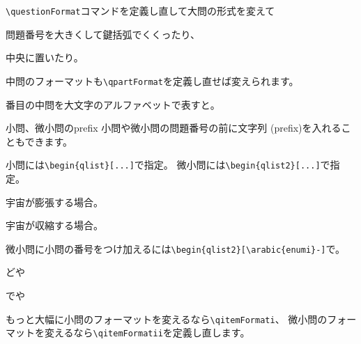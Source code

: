 \documentclass[dvipdfmx,11pt,a4j]{jarticle}
\begin{document}
\verb"\questionFormat"コマンドを定義し直して大問の形式を変えて

\renewcommand{\questionFormat}[1]{%
	{\Large 〔{\gt #1}〕}~%
}
問題番号を大きくして鍵括弧でくくったり、

\renewcommand{\questionFormat}[1]{%
	\begin{center}{\textbf{\LARGE{#1}}}\end{center}
}
中央に置いたり。

\begin{qparts}
	\qpart 中問のフォーマットも\verb"\qpartFormat"を定義し直せば変えられます。

	\renewcommand{\qpartFormat}[1]{%
		\item [\LARGE{\textbf{\Alph{#1}}.}]
	}
	\qpart {}番目の中問を大文字のアルファベットで表すと。

	\qpart 小問、微小問のprefix
		小問や微小問の問題番号の前に文字列 (prefix)を入れることもできます。

		\begin{qlist}[小問]
			\qitem 小問には{\tt \verb"\begin{qlist}[...]"}で指定。
			\qitem 微小問には{\tt \verb"\begin{qlist2}[...]"}で指定。
				\begin{qlist2}[case ]
					\item 宇宙が膨張する場合。
					\item 宇宙が収縮する場合。
				\end{qlist2}
				
			\qitem 微小問に小問の番号をつけ加えるには{\tt \verb"\begin{qlist2}[\arabic{enumi}-]"}で。
				\begin{qlist2}
					\item どや
					\item でや
				\end{qlist2}
		\end{qlist}
		
	\qpart もっと大幅に小問のフォーマットを変えるなら\verb"\qitemFormati"、
		微小問のフォーマットを変えるなら\verb"\qitemFormatii"を定義し直します。
		\renewcommand{\qitemFormati}[1]{%
			\textbf{問 \arabicz{\arabic{enumi}}}
		}
		
                \renewcommand{\qitemFormatii}[1]{%
                		\textbf{微小問 #1\arabic{enumii}}
                }
                

\end{qparts}
\end{document}
